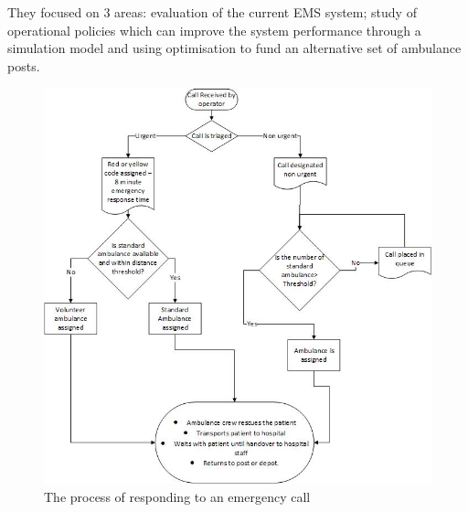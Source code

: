 \documentclass[11pt]{article} %
\begin{document}
	They focused on 3 areas: evaluation of the current EMS system; study of operational policies which can improve the system performance through a simulation model and using optimisation to fund an alternative set of ambulance posts. 
	\begin{figure}
		\centering
		\includegraphics[width=\linewidth]{Report_images/MilanEMS}
		\caption{The process of responding to an emergency call}
		\label{fig:milanems}
	\end{figure}
\end{document}
